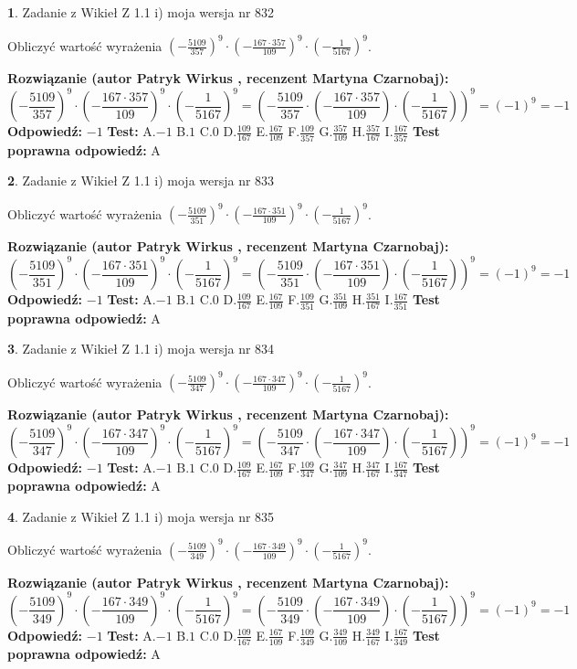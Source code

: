 \documentclass[12pt, a4paper]{article}
\theoremstyle{definition} %
\newtheorem{zad}{}
\newcommand{\zadStart}[1]{\begin{zad}#1\newline}
\newcommand{\zadStop}{\end{zad}}
\newcommand{\rozwStart}[2]{\noindent \textbf{Rozwiązanie (autor #1 , recenzent #2): }\newline}
\newcommand{\rozwStop}{\newline}
\newcommand{\odpStart}{\noindent \textbf{Odpowiedź:}\newline}
\newcommand{\odpStop}{\newline}
\newcommand{\testStart}{\noindent \textbf{Test:}\newline}
\newcommand{\testStop}{\newline}
\newcommand{\kluczStart}{\noindent \textbf{Test poprawna odpowiedź:}\newline}
\newcommand{\kluczStop}{\newline}
\begin{document}
\zadStart{Zadanie z Wikieł Z 1.1 i) moja wersja nr 832}

Obliczyć wartość wyrażenia $(-\frac{5109}{357})^{9} \cdot (-\frac{167 \cdot 357}{109})^{9} \cdot (-\frac{1}{5167})^{9}$.
\zadStop
\rozwStart{Patryk Wirkus}{Martyna Czarnobaj}
$$(-\frac{5109}{357})^{9} \cdot (-\frac{167 \cdot 357}{109})^{9} \cdot (-\frac{1}{5167})^{9} = (-\frac{5109}{357} \cdot (-\frac{167 \cdot 357}{109}) \cdot (-\frac{1}{5167}))^{9} = (-1)^{9} = -1$$
\rozwStop
\odpStart
$-1$
\odpStop
\testStart
A.$-1$ B.$1$ C.$0$ D.$\frac{109}{167}$ E.$\frac{167}{109}$
F.$\frac{109}{357}$ G.$\frac{357}{109}$
H.$\frac{357}{167}$
I.$\frac{167}{357}$
\testStop
\kluczStart
A
\kluczStop



\zadStart{Zadanie z Wikieł Z 1.1 i) moja wersja nr 833}

Obliczyć wartość wyrażenia $(-\frac{5109}{351})^{9} \cdot (-\frac{167 \cdot 351}{109})^{9} \cdot (-\frac{1}{5167})^{9}$.
\zadStop
\rozwStart{Patryk Wirkus}{Martyna Czarnobaj}
$$(-\frac{5109}{351})^{9} \cdot (-\frac{167 \cdot 351}{109})^{9} \cdot (-\frac{1}{5167})^{9} = (-\frac{5109}{351} \cdot (-\frac{167 \cdot 351}{109}) \cdot (-\frac{1}{5167}))^{9} = (-1)^{9} = -1$$
\rozwStop
\odpStart
$-1$
\odpStop
\testStart
A.$-1$ B.$1$ C.$0$ D.$\frac{109}{167}$ E.$\frac{167}{109}$
F.$\frac{109}{351}$ G.$\frac{351}{109}$
H.$\frac{351}{167}$
I.$\frac{167}{351}$
\testStop
\kluczStart
A
\kluczStop



\zadStart{Zadanie z Wikieł Z 1.1 i) moja wersja nr 834}

Obliczyć wartość wyrażenia $(-\frac{5109}{347})^{9} \cdot (-\frac{167 \cdot 347}{109})^{9} \cdot (-\frac{1}{5167})^{9}$.
\zadStop
\rozwStart{Patryk Wirkus}{Martyna Czarnobaj}
$$(-\frac{5109}{347})^{9} \cdot (-\frac{167 \cdot 347}{109})^{9} \cdot (-\frac{1}{5167})^{9} = (-\frac{5109}{347} \cdot (-\frac{167 \cdot 347}{109}) \cdot (-\frac{1}{5167}))^{9} = (-1)^{9} = -1$$
\rozwStop
\odpStart
$-1$
\odpStop
\testStart
A.$-1$ B.$1$ C.$0$ D.$\frac{109}{167}$ E.$\frac{167}{109}$
F.$\frac{109}{347}$ G.$\frac{347}{109}$
H.$\frac{347}{167}$
I.$\frac{167}{347}$
\testStop
\kluczStart
A
\kluczStop



\zadStart{Zadanie z Wikieł Z 1.1 i) moja wersja nr 835}

Obliczyć wartość wyrażenia $(-\frac{5109}{349})^{9} \cdot (-\frac{167 \cdot 349}{109})^{9} \cdot (-\frac{1}{5167})^{9}$.
\zadStop
\rozwStart{Patryk Wirkus}{Martyna Czarnobaj}
$$(-\frac{5109}{349})^{9} \cdot (-\frac{167 \cdot 349}{109})^{9} \cdot (-\frac{1}{5167})^{9} = (-\frac{5109}{349} \cdot (-\frac{167 \cdot 349}{109}) \cdot (-\frac{1}{5167}))^{9} = (-1)^{9} = -1$$
\rozwStop
\odpStart
$-1$
\odpStop
\testStart
A.$-1$ B.$1$ C.$0$ D.$\frac{109}{167}$ E.$\frac{167}{109}$
F.$\frac{109}{349}$ G.$\frac{349}{109}$
H.$\frac{349}{167}$
I.$\frac{167}{349}$
\testStop
\kluczStart
A
\kluczStop
\end{document}
